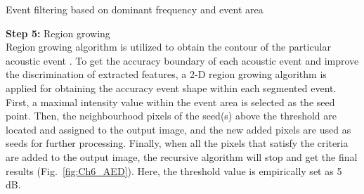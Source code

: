 \begin{algorithm}
\DontPrintSemicolon
{}

\caption{Event filtering based on dominant frequency and event area}
\end{algorithm}






\noindent \textbf{Step 5:} Region growing
\\
Region growing algorithm is utilized to obtain the contour of the particular acoustic event \cite{mallawaarachchi2008spectrogram}. To get the accuracy boundary of each acoustic event and improve the discrimination of extracted features, a 2-D region growing algorithm is applied for obtaining the accuracy event shape within each segmented event. First, a maximal intensity value within the event area is selected as the seed point. Then, the neighbourhood pixels of the seed(s) above the threshold are located and assigned to the output image, and the new added pixels are used as seeds for further processing. Finally, when all the pixels that satisfy the criteria are added to the output image, the recursive algorithm will stop and get the final results (Fig.~\ref{fig:Ch6_AED}). Here, the threshold value is empirically set as 5 dB.

